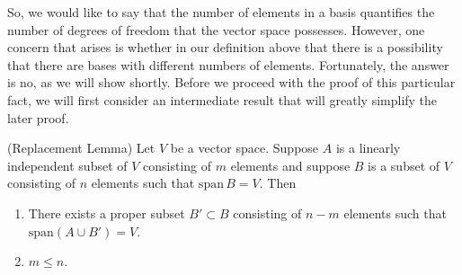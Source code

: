 So, we would like to say that the number of elements in a basis quantifies the number of degrees of freedom that the vector space possesses. However, one concern that arises is whether in our definition above that there is a possibility that there are bases with different numbers of elements. Fortunately, the answer is no, as we will show shortly. Before we proceed with the proof of this particular fact, we will first consider an intermediate result that will greatly simplify the later proof.
\begin{lemma}
  \label{thm:replace}
  (Replacement Lemma) Let \( V \) be a vector space. Suppose \( A \) is a linearly independent subset of \( V \) consisting of \( m \) elements and suppose \( B \) is a subset of \( V \) consisting of \( n \) elements such that \( \text{span}\, B=V \). Then
  \begin{enumerate}[label=(\alph*)]
  \item There exists a proper subset \( B'\subset B \) consisting of \( n-m \) elements such that \( \text{span}(A\cup B')=V \).
  \item \( m\leq n \).
  \end{enumerate}
\end{lemma}

